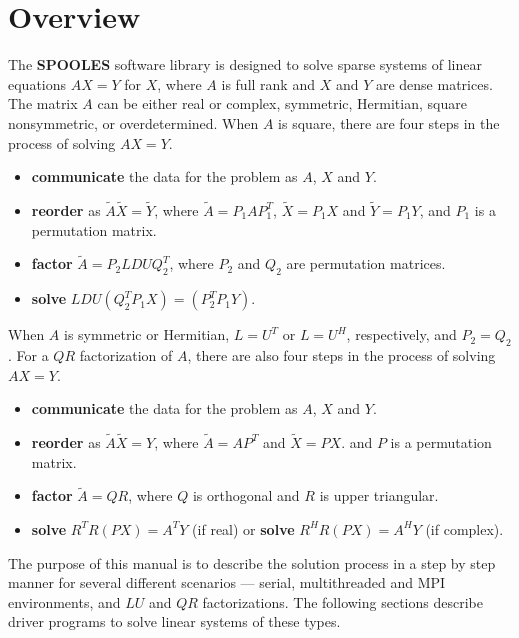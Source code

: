 \vfill \eject
\par
\section{Overview}
\label{chapter:overview}
\par
The {\bf SPOOLES} software library is designed to solve sparse
systems of linear equations
$A X = Y$ for $X$, where $A$ is full rank 
and $X$ and $Y$ are dense matrices.  
The matrix $A$ can be either real or complex, symmetric, Hermitian, 
square nonsymmetric, or overdetermined. 
When $A$ is square, 
there are four steps in the process of solving $A X = Y$.
\begin{itemize}
\item 
{\bf communicate} the data for the problem as $A$, $X$ and $Y$.
\item 
{\bf reorder} as
${\widetilde A} {\widetilde X} = {\widetilde Y}$, where
${\widetilde A} = P_1 A P_1^T$,
${\widetilde X} = P_1 X$ and
${\widetilde Y} = P_1 Y$,
and $P_1$ is a permutation matrix.
\item 
{\bf factor} $ {\widetilde A} = P_2LDUQ_2^T$,
where $P_2$ and $Q_2$ are permutation matrices.
\item 
{\bf solve}  $LDU (Q_2^T P_1 X) = (P_2^T P_1 Y)$.
\end{itemize}
When $A$ is symmetric or Hermitian, $L = U^T$ or $L = U^H$,
respectively, and $P_2 = Q_2$.
For a $QR$ factorization of $A$,
there are also four steps in the process of solving $A X = Y$.
\begin{itemize}
\item 
{\bf communicate} the data for the problem as $A$, $X$ and $Y$.
\item 
{\bf reorder} as
${\widetilde A} {\widetilde X} = Y$, where
${\widetilde A} = A P^T$ and
${\widetilde X} = P X$.
and $P$ is a permutation matrix.
\item 
{\bf factor} $ {\widetilde A} = Q R$,
where $Q$ is orthogonal and $R$ is upper triangular.
\item 
{\bf solve}  $R^T R (P X) = A^T Y$ (if real)
or {\bf solve}  $R^H R (P X) = A^H Y$ (if complex).
\end{itemize}
\par
The purpose of this manual is to describe the solution process in a
step by step manner for several different scenarios --- serial,
multithreaded and MPI environments, and $LU$ and $QR$ factorizations.
The following sections describe driver programs to solve linear
systems of these types.
\par
